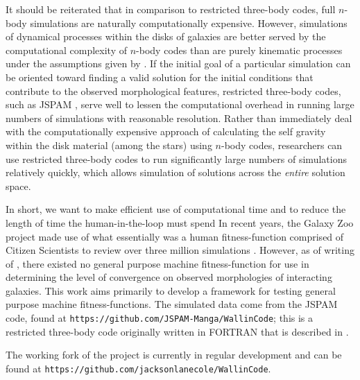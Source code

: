 It should be reiterated that in comparison to restricted three-body codes,
full $n$-body simulations are naturally computationally expensive.
However, simulations of dynamical processes within the disks of galaxies
are better served by the computational complexity of $n$-body codes than are
purely kinematic processes under the assumptions given by
\citet{Toomre1972}.
If the initial goal of a particular simulation can be oriented
toward finding a valid solution for the initial conditions that contribute to
the observed morphological features,
restricted three-body codes, such as JSPAM \cite{Wallin2016}, serve well
to lessen the computational overhead in running large numbers of simulations
with reasonable resolution.
Rather than immediately deal
with the computationally expensive approach of calculating the self gravity
within the disk material (among the stars) using $n$-body codes,
researchers can use restricted three-body codes to run significantly large
numbers of simulations
relatively quickly, which allows simulation of solutions across the
\textit{entire} solution space.

In short, we want to make efficient use of computational time
and to reduce the length of time the human-in-the-loop must spend
In recent years, the Galaxy Zoo project made use of what essentially was a
human fitness-function comprised of Citizen Scientists to review
over three million simulations \cite{Holincheck2015}.
However, as of writing of \citet{Holincheck2015}, there existed no general
purpose machine fitness-function for use in determining the level of
convergence on observed morphologies of interacting galaxies. This work aims
primarily to develop a framework for testing general purpose machine
fitness-functions.
The simulated data come from the JSPAM code, found at
\texttt{https://github.com/JSPAM-Manga/WallinCode}; this is a restricted
three-body code originally written in FORTRAN that is described in
\citet{Wallin2016}.

The working fork of the project is currently in regular development and can be
found at \texttt{https://github.com/jacksonlanecole/WallinCode}.
